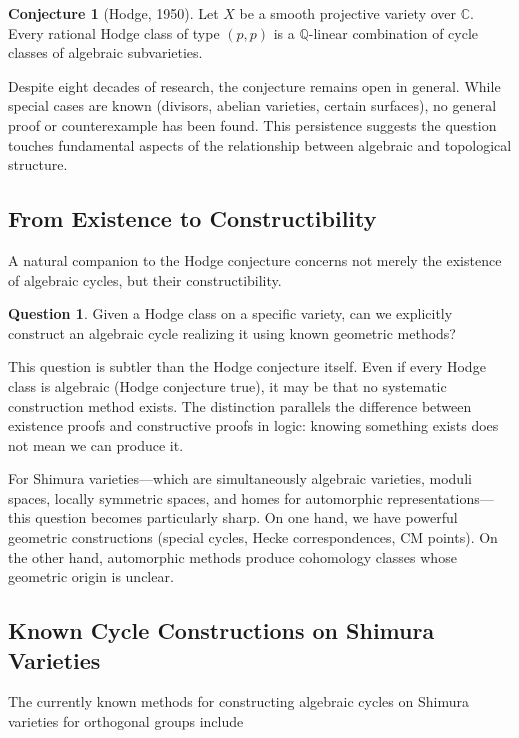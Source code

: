 \documentclass[12pt]{amsart}
\theoremstyle{definition}
\newtheorem{conjecture}[theorem]{Conjecture}
\newtheorem{question}[theorem]{Question}
\newcommand{\Q}{\mathbb{Q}}
\newcommand{\C}{\mathbb{C}}
\begin{document}
\begin{conjecture}[Hodge, 1950]
Let $X$ be a smooth projective variety over $\C$. Every rational Hodge class of type $(p,p)$ is a $\Q$-linear combination of cycle classes of algebraic subvarieties.
\end{conjecture}

Despite eight decades of research, the conjecture remains open in general. While special cases are known (divisors, abelian varieties, certain surfaces), no general proof or counterexample has been found. This persistence suggests the question touches fundamental aspects of the relationship between algebraic and topological structure.

\subsection{From Existence to Constructibility}

A natural companion to the Hodge conjecture concerns not merely the existence of algebraic cycles, but their {constructibility}.

\begin{question}
Given a Hodge class on a specific variety, can we explicitly construct an algebraic cycle realizing it using known geometric methods?
\end{question}

This question is subtler than the Hodge conjecture itself. Even if every Hodge class is algebraic (Hodge conjecture true), it may be that no systematic construction method exists. The distinction parallels the difference between existence proofs and constructive proofs in logic: knowing something exists does not mean we can produce it.

For Shimura varieties---which are simultaneously algebraic varieties, moduli spaces, locally symmetric spaces, and homes for automorphic representations---this question becomes particularly sharp. On one hand, we have powerful geometric constructions (special cycles, Hecke correspondences, CM points). On the other hand, automorphic methods produce cohomology classes whose geometric origin is unclear.

\subsection{Known Cycle Constructions on Shimura Varieties}

The currently known methods for constructing algebraic cycles on Shimura varieties for orthogonal groups include
\end{document}

